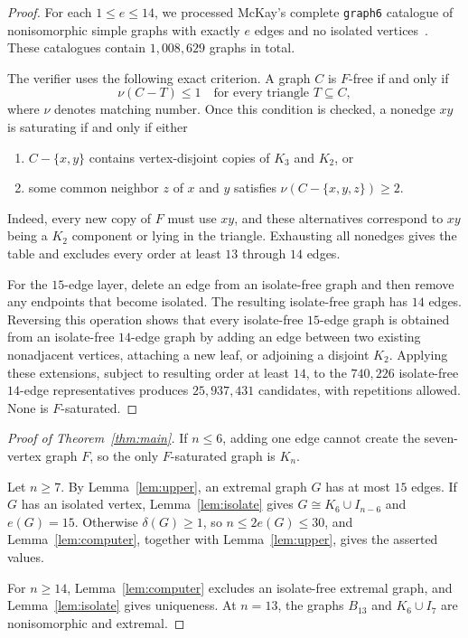 \documentclass[11pt]{amsart}
\begin{document}
\begin{proof}
For each $1\le e\le14$, we processed McKay's complete \texttt{graph6}
catalogue of nonisomorphic simple graphs with exactly $e$ edges and no isolated
vertices~\cite{McKayData,McKayPiperno}. These catalogues contain
$1{,}008{,}629$ graphs in total.

The verifier uses the following exact criterion. A graph $C$ is $F$-free if and
only if
\[
\nu(C-T)\le1
\quad\text{for every triangle }T\subseteq C,
\]
where $\nu$ denotes matching number. Once this condition is checked, a nonedge
$xy$ is saturating if and only if either
\begin{enumerate}
\item $C-\{x,y\}$ contains vertex-disjoint copies of $K_3$ and $K_2$, or
\item some common neighbor $z$ of $x$ and $y$ satisfies
$\nu(C-\{x,y,z\})\ge2$.
\end{enumerate}
Indeed, every new copy of $F$ must use $xy$, and these alternatives correspond
to $xy$ being a $K_2$ component or lying in the triangle. Exhausting all
nonedges gives the table and excludes every order at least $13$ through
$14$ edges.

For the $15$-edge layer, delete an edge from an isolate-free graph and then
remove any endpoints that become isolated. The resulting isolate-free graph has
$14$ edges. Reversing this operation shows that every isolate-free $15$-edge
graph is obtained from an isolate-free $14$-edge graph by adding an edge between
two existing nonadjacent vertices, attaching a new leaf, or adjoining a
disjoint $K_2$. Applying these extensions, subject to resulting order at least
$14$, to the $740{,}226$ isolate-free $14$-edge representatives produces
$25{,}937{,}431$ candidates, with repetitions allowed. None is $F$-saturated.
\end{proof}

\begin{proof}[Proof of Theorem~\ref{thm:main}]
If $n\le6$, adding one edge cannot create the seven-vertex graph $F$, so the
only $F$-saturated graph is $K_n$.

Let $n\ge7$. By Lemma~\ref{lem:upper}, an extremal graph $G$ has at most $15$
edges. If $G$ has an isolated vertex, Lemma~\ref{lem:isolate} gives
$G\cong K_6\cup I_{n-6}$ and $e(G)=15$. Otherwise $\delta(G)\ge1$, so
$n\le2e(G)\le30$, and Lemma~\ref{lem:computer}, together with
Lemma~\ref{lem:upper}, gives the asserted values.

For $n\ge14$, Lemma~\ref{lem:computer} excludes an isolate-free extremal graph,
and Lemma~\ref{lem:isolate} gives uniqueness. At $n=13$, the graphs $B_{13}$
and $K_6\cup I_7$ are nonisomorphic and extremal.
\end{proof}
\end{document}
